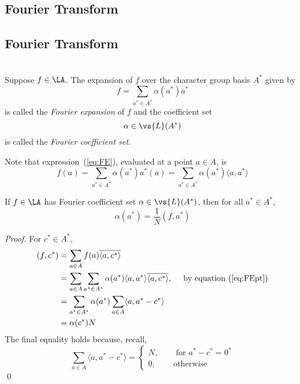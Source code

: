 {\subsection{Fourier Transform}}
{\subsection{Fourier Transform\protect\footnotemark}
}
\begin{definition}\\
Suppose $f\in \LA$. The expansion of $f$ over the character group basis
$A^*$ given by
\begin{equation}\label{eq:FE}
f = \sum_{a^*\in A^*} \alpha(a^*)a^*
\end{equation}
is called the \emph{Fourier expansion} of $f$ and the coefficient set 
\[
\alpha \in \vs{L}(A^*)
\]
is called the \emph{Fourier coefficient set}.
\end{definition}
Note that expression~(\ref{eq:FE}), evaluated at a point $a\in A$, is
\begin{equation}\label{eq:FEpt}
f(a) = \sum_{a^*\in A^*} \alpha(a^*)a^*(a)
= \sum_{a^*\in A^*} \alpha(a^*)\langle a,a^*\rangle 
\end{equation}
\begin{theorem}\label{thm:Fcoef}
If $f\in \LA$ has Fourier coefficient set $\alpha \in \vs{L}(A^*)$, then for all
$a^*\in A^*$,
\begin{equation}\label{eq:Fcoef}
\alpha(a^*) = \frac{1}{N} (f,a^*)
\end{equation}
\end{theorem}
\begin{proof}
For $c^* \in A^*$,
\begin{align*}
(f,c^*)&= \sum_{a\in A}f(a)\overline{\langle a,c^*\rangle} \\
&= \sum_{a\in A}\sum_{a^*\in A^*} \alpha(a^*)\langle a,a^*\rangle
\overline{\langle a,c^*\rangle}, \quad
\text{ by equation~(\ref{eq:FEpt})}\\
&= \sum_{a^*\in A^*} \alpha(a^*)\sum_{a\in A} \langle a,a^*-c^*\rangle\\
&= \alpha(c^*)N
\end{align*}
The final equality holds because, recall,
\[
\sum_{a\in A} \langle a,a^*-c^*\rangle = 
\left\{\begin{array}{ll}
N,&\quad \text{ for } a^* - c^* = 0^*\\
0,&\quad \text{otherwise}
\end{array}\right .
\]
\qed
\end{proof}
